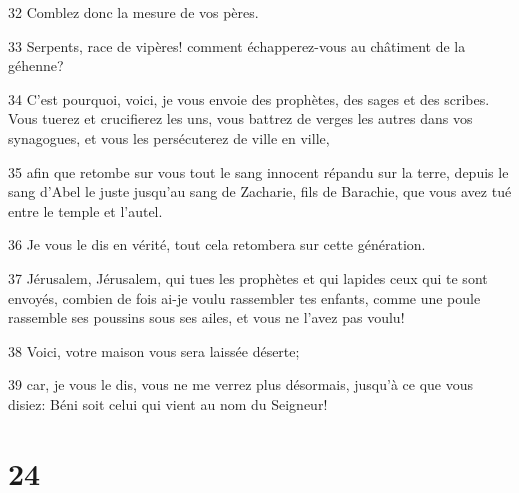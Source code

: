 \par 32 Comblez donc la mesure de vos pères.
\par 33 Serpents, race de vipères! comment échapperez-vous au châtiment de la géhenne?
\par 34 C'est pourquoi, voici, je vous envoie des prophètes, des sages et des scribes. Vous tuerez et crucifierez les uns, vous battrez de verges les autres dans vos synagogues, et vous les persécuterez de ville en ville,
\par 35 afin que retombe sur vous tout le sang innocent répandu sur la terre, depuis le sang d'Abel le juste jusqu'au sang de Zacharie, fils de Barachie, que vous avez tué entre le temple et l'autel.
\par 36 Je vous le dis en vérité, tout cela retombera sur cette génération.
\par 37 Jérusalem, Jérusalem, qui tues les prophètes et qui lapides ceux qui te sont envoyés, combien de fois ai-je voulu rassembler tes enfants, comme une poule rassemble ses poussins sous ses ailes, et vous ne l'avez pas voulu!
\par 38 Voici, votre maison vous sera laissée déserte;
\par 39 car, je vous le dis, vous ne me verrez plus désormais, jusqu'à ce que vous disiez: Béni soit celui qui vient au nom du Seigneur!

\chapter{24}

